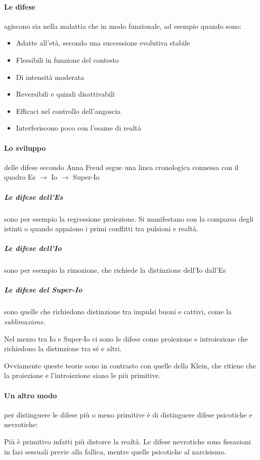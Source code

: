 \documentclass[12pt, a4paper]{article}
\begin{document}
\paragraph{Le difese} agiscono sia nella malattia che in modo funzionale, ad esempio quando sono:

\begin{itemize}
    \item Adatte all'et\`a, secondo una successione evolutiva stabile
    \item Flessibili in funzione del contesto
    \item Di intensit\`a moderata
    \item Reversibili e quindi disattivabili
    \item Efficaci nel controllo dell'angoscia
    \item Interferiscono poco con l'esame di realt\`a
\end{itemize}

\paragraph{Lo sviluppo} delle difese secondo Anna Freud segue una linea cronologica connessa con il quadro Es $\rightarrow$ Io $\rightarrow$ Super-Io

\subparagraph{Le difese dell'Es} sono per esempio la regressione proiezione. Si manifestano con la comparsa degli istinti o quando appaiono i primi conflitti tra pulsioni e realt\`a. 

\subparagraph{Le difese dell'Io} sono per esempio la rimozione, che richiede la distinzione dell'Io dall'Es

\subparagraph{Le difese del Super-Io} sono quelle che richiedono distinzione tra impulsi buoni e cattivi, come la \emph{sublimazione}.

Nel mezzo tra Io e Super-Io ci sono le difese come proiezione e introiezione che richiedono la distinzione tra s\'e e altri.

Ovviamente queste teorie sono in contrasto con quelle della Klein, che ritiene che la proiezione e l'introiezione siano le pi\`u primitive.

\paragraph{Un altro modo} per distinguere le difese pi\`u o meno primitive \`e di distinguere difese psicotiche e nevrotiche:

Pi\`u \`e primitivo infatti pi\`u distorce la realt\`a. Le difese nevrotiche sono fissazioni in fasi sessuali previe alla fallica, mentre quelle psicotiche al narcisismo.
\end{document}
